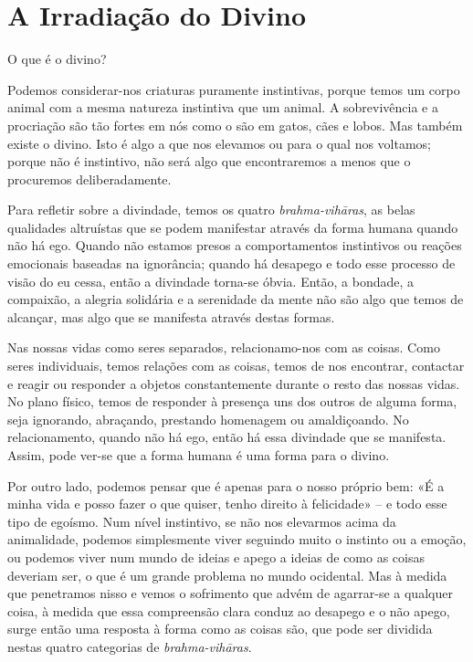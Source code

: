 \chapter{A Irradiação do Divino}

O que é o divino?

Podemos considerar-nos criaturas puramente instintivas, porque temos um corpo
animal com a mesma natureza instintiva que um animal. A sobrevivência e a
procriação são tão fortes em nós como o são em gatos, cães e lobos. Mas também
existe o divino. Isto é algo a que nos elevamos ou para o qual nos voltamos;
porque não é instintivo, não será algo que encontraremos a menos que o
procuremos deliberadamente.

Para refletir sobre a divindade, temos os quatro \emph{brahma-vihāras}, as
belas qualidades altruístas que se podem manifestar através da forma humana
quando não há ego. Quando não estamos presos a comportamentos instintivos ou
reações emocionais baseadas na ignorância; quando há desapego e todo esse
processo de visão do eu cessa, então a divindade torna-se óbvia. Então, a
bondade, a compaixão, a alegria solidária e a serenidade da mente não são algo
que temos de alcançar, mas algo que se manifesta através destas formas.

Nas nossas vidas como seres separados, relacionamo-nos com as coisas. Como
seres individuais, temos relações com as coisas, temos de nos encontrar,
contactar e reagir ou responder a objetos constantemente durante o resto das
nossas vidas. No plano físico, temos de responder à presença uns dos outros de
alguma forma, seja ignorando, abraçando, prestando homenagem ou amaldiçoando. No
relacionamento, quando não há ego, então há essa divindade que se manifesta.
Assim, pode ver-se que a forma humana é uma forma para o divino.

Por outro lado, podemos pensar que é apenas para o nosso próprio bem: «É a minha
vida e posso fazer o que quiser, tenho direito à felicidade» -- e todo esse tipo
de egoísmo. Num nível instintivo, se não nos elevarmos acima da animalidade,
podemos simplesmente viver seguindo muito o instinto ou a emoção, ou podemos
viver num mundo de ideias e apego a ideias de como as coisas deveriam ser, o que
é um grande problema no mundo ocidental. Mas à medida que penetramos nisso e
vemos o sofrimento que advém de agarrar-se a qualquer coisa, à medida que essa
compreensão clara conduz ao desapego e o não apego, surge então uma resposta à
forma como as coisas são, que pode ser dividida nestas quatro categorias de
\emph{brahma-vihāras}.


